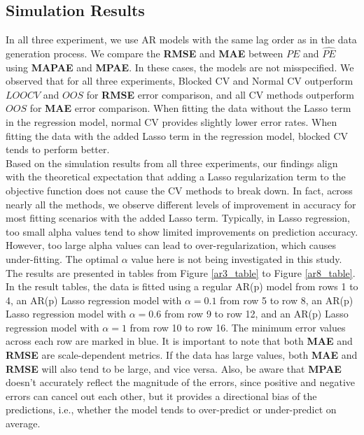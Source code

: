 \documentclass[12pt, oneside]{amsart}
\theoremstyle{definition}
\theoremstyle{remark}
\numberwithin{equation}{section}
\begin{document}
\subsection{Simulation Results}
In all three experiment, we use AR models with the same lag order as in the data generation process. We compare the \textbf{RMSE} and \textbf{MAE} between $PE$ and $\hat{PE}$ using \textbf{MAPAE} and \textbf{MPAE}. In these cases, the models are not misspecified. We observed that for all three experiments, Blocked CV and Normal CV outperform $LOOCV$ and $OOS$ for \textbf{RMSE} error comparison, and all CV methods outperform $OOS$ for \textbf{MAE} error comparison. When fitting the data without the Lasso term in the regression model, normal CV provides slightly lower error rates. When fitting the data with the added Lasso term in the regression model, blocked CV tends to perform better. \\

Based on the simulation results from all three experiments, our findings align with the theoretical expectation that adding a Lasso regularization term to the objective function does not cause the CV methods to break down. In fact, across nearly all the methods, we observe different levels of improvement in accuracy for most fitting scenarios with the added Lasso term. Typically, in Lasso regression, too small alpha values tend to show limited improvements on prediction accuracy. However, too large alpha values can lead to over-regularization, which causes under-fitting. The optimal $\alpha$ value here is not being investigated in this study.\\

The results are presented in tables from Figure \ref{ar3_table} to Figure \ref{ar8_table}. In the result tables, the data is fitted using a regular AR(p) model from rows 1 to 4, an AR(p) Lasso regression model with $\alpha = 0.1$ from row 5 to row 8, an AR(p) Lasso regression model with $\alpha = 0.6$ from row 9 to row 12, and an AR(p) Lasso regression model with $\alpha = 1$ from row 10 to row 16. The minimum error values across  each row are marked in blue. It is important to note that both \textbf{MAE} and \textbf{RMSE} are scale-dependent metrics. If the data has large values, both \textbf{MAE} and \textbf{RMSE} will also tend to be large, and vice versa. Also, be aware that \textbf{MPAE} doesn't accurately reflect the magnitude of the errors, since positive and negative errors can cancel out each other, but it provides a directional bias of the predictions, i.e., whether the model tends to over-predict or under-predict on average. 
\end{document}
